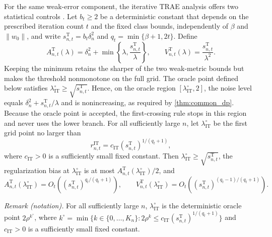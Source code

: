 \documentclass[12pt]{article}
\theoremstyle{plain}
\theoremstyle{definition}
\theoremstyle{remark}
\begin{document}
For the same weak-error component, the iterative TRAE analysis offers two statistical controls \citep[Theorem~6]{bennett2023source}. Let $b_t\geqslant2$ be a deterministic constant that depends on the prescribed iteration count $t$ and the fixed class bounds, independently of $\beta$ and $\|w_0\|$, and write
$s_{n,t}^{\mathrm T}=b_t\delta_n^2$ and
$q_t=\min\{\beta+1,2t\}$. Define
\begin{equation}\label{eq:iter_trae_scale}
A_{n,t}^{\mathrm T}(\lambda)
=\delta_n^2+\min\left\{\lambda,\frac{s_{n,t}^{\mathrm T}}{\lambda}\right\},
\qquad
V_{n,t}^{\mathrm T}(\lambda)
=\frac{s_{n,t}^{\mathrm T}}{\lambda^2}.
\end{equation}
Keeping the minimum retains the sharper of the two weak-metric bounds but makes the threshold nonmonotone on the full grid. The oracle point defined below satisfies $\lambda_{\mathrm{IT}}^\circ\geqslant\sqrt{s_{n,t}^{\mathrm T}}$. Hence, on the oracle region $[\lambda_{\mathrm{IT}}^\circ,2]$, the noise level equals $\delta_n^2+s_{n,t}^{\mathrm T}/\lambda$ and is nonincreasing, as required by \cref{thm:common_dp}. Because the oracle point is accepted, the first-crossing rule stops in this region and never uses the lower branch. For all sufficiently large $n$, let $\lambda_{\mathrm{IT}}^\circ$ be the first grid point no larger than
\[
r_{n,t}^{\mathrm{IT}} =c_{\mathrm{IT}}(s_{n,t}^{\mathrm T})^{1/(q_t+1)},
\]
where $c_{\mathrm{IT}}>0$ is a sufficiently small fixed constant. Then
$\lambda_{\mathrm{IT}}^\circ\geqslant\sqrt{s_{n,t}^{\mathrm T}}$, the regularization bias at $\lambda_{\mathrm{IT}}^\circ$ is at most
$A_{n,t}^{\mathrm T}(\lambda_{\mathrm{IT}}^\circ)/2$, and
\begin{equation}\label{eq:iter_trae_oracle_scales}
A_{n,t}^{\mathrm T}(\lambda_{\mathrm{IT}}^\circ)
=O_t\!\left((s_{n,t}^{\mathrm T})^{q_t/(q_t+1)}\right),\qquad
V_{n,t}^{\mathrm T}(\lambda_{\mathrm{IT}}^\circ)
=O_t\!\left((s_{n,t}^{\mathrm T})^{(q_t-1)/(q_t+1)}\right).
\end{equation}

\noindent\textit{Remark (notation).} For all sufficiently large $n$, $\lambda_{\mathrm{IT}}^\circ$ is the deterministic oracle point $2\rho^{k^\circ}$, where $k^\circ=\min\{k\in\{0,\ldots,K_n\}:2\rho^k\leqslant c_{\mathrm{IT}}(s_{n,t}^{\mathrm T})^{1/(q_t+1)}\}$ and $c_{\mathrm{IT}}>0$ is a sufficiently small fixed constant.
\end{document}
